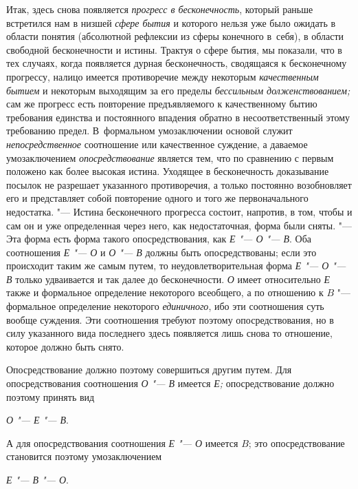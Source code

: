 Итак, здесь снова появляется
{\em прогресс в бесконечность},
который раньше встретился нам в низшей
{\em сфере бытия} и
которого нельзя уже было ожидать в области понятия (абсолютной рефлексии из
сферы конечного в~себя), в области свободной бесконечности и истины.
Трактуя о сфере бытия, мы показали, что в тех случаях, когда появляется
дурная бесконечность, сводящаяся к бесконечному прогрессу, налицо имеется
противоречие между некоторым
{\em качественным бытием}
и некоторым выходящим за его пределы
{\em бессильным долженствованием;}
сам же прогресс есть повторение предъявляемого к
качественному бытию требования единства и постоянного впадения обратно в
несоответственный этому требованию предел. В~формальном умозаключении
основой служит {\em непосредственное}
соотношение или качественное суждение, а даваемое
умозаключением {\em опосредствование}
является тем, что по сравнению с первым положено как более
высокая истина. Уходящее в бесконечность доказывание посылок не разрешает
указанного противоречия, а только постоянно возобновляет его и представляет
собой повторение одного и того же первоначального недостатка. "---
Истина бесконечного прогресса состоит, напротив, в том, чтобы
и сам он и уже определенная через него, как недостаточная, форма были
сняты. "--- Эта форма есть форма такого опосредствования, как
{\em Е "--- О "--- В}. Оба соотношения {\em Е "--- О} и {\em О
"--- В} должны быть опосредствованы; если это
происходит таким же самым путем, то неудовлетворительная форма {\em Е "--- О
"--- В} только удваивается и так далее до
бесконечности. {\em О} имеет относительно {\em Е} также и
формальное определение некоторого всеобщего, а по отношению к
$B$ "--- формальное определение некоторого
{\em единичного}, ибо эти
соотношения суть вообще суждения. Эти соотношения требуют поэтому
опосредствования, но в силу указанного вида последнего здесь появляется
лишь снова то отношение, которое должно быть снято.

Опосредствование должно поэтому совершиться другим путем. Для
опосредствования соотношения {\em О "--- В} имеется
{\em Е;} опосредствование должно поэтому принять вид

{\centering
{\em О "--- Е
"--- В}.
\par}

А для опосредствования соотношения {\em Е "--- О}
имеется $B$; это опосредствование становится поэтому умозаключением

{\centering
{\em Е "--- В
"--- О}.
\par}

